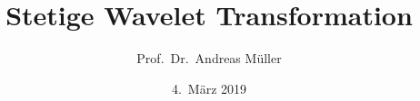 %
%
%
\usepackage[utf8]{inputenc}
\usepackage[T1]{fontenc}
\usepackage{epic}
\usepackage{color}
\usepackage{array}
\usepackage{ifthen}
\usepackage{amsmath}
\usepackage{lmodern}
\usepackage{tikz}
\usetikzlibrary{shapes.geometric}
\beamertemplatenavigationsymbolsempty
\title[CWT]{Stetige Wavelet Transformation}
\author[A.~Müller]{Prof.~Dr.~Andreas Müller}
\date[]{4.~März 2019}
\newtheorem{satz}{Satz}
